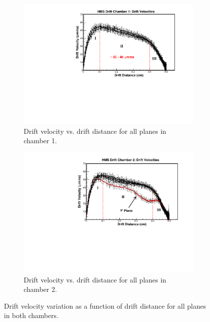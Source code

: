 \documentclass[journal, a4paper]{IEEEtran}
\begin{document}
\begin{figure}[!ht]
	\centering
	\begin{subfigure}{0.4\textwidth} %
		\includegraphics[width=\textwidth]{drift_vel_dc1.pdf}
		\caption{Drift velocity vs. drift distance for all planes in chamber 1.} %
    \label{fig:drift_vel_dc1}
	\end{subfigure}
	\vspace{1em} %
	\begin{subfigure}{0.4\textwidth} %
		\includegraphics[width=\textwidth]{drift_vel_dc2.pdf}
		\caption{Drift velocity vs. drift distance for all planes in chamber 2.} %
    \label{fig:drift_vel_dc2}
  \end{subfigure}
	\caption{Drift velocity variation as a function of drift distance for all planes in both chambers.} %
  \label{fig:drift_vel}
\end{figure}\\
\end{document}
